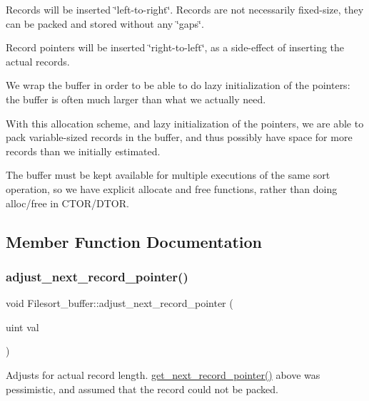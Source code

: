 Records will be inserted \char`\"{}left-\/to-\/right\char`\"{}. Records are not necessarily fixed-\/size, they can be packed and stored without any \char`\"{}gaps\char`\"{}.

Record pointers will be inserted \char`\"{}right-\/to-\/left\char`\"{}, as a side-\/effect of inserting the actual records.

We wrap the buffer in order to be able to do lazy initialization of the pointers\+: the buffer is often much larger than what we actually need.

With this allocation scheme, and lazy initialization of the pointers, we are able to pack variable-\/sized records in the buffer, and thus possibly have space for more records than we initially estimated.

The buffer must be kept available for multiple executions of the same sort operation, so we have explicit allocate and free functions, rather than doing alloc/free in C\+T\+O\+R/\+D\+T\+OR. 

\subsection{Member Function Documentation}
\mbox{\label{classFilesort__buffer_a69e06f3b69cc78e6450de38e2508e208}} 
\subsubsection{\texorpdfstring{adjust\+\_\+next\+\_\+record\+\_\+pointer()}{adjust\_next\_record\_pointer()}}
{\footnotesize\ttfamily void Filesort\+\_\+buffer\+::adjust\+\_\+next\+\_\+record\+\_\+pointer (\begin{DoxyParamCaption}\item[{uint}]{val }\end{DoxyParamCaption})\hspace{0.3cm}{\ttfamily [inline]}}

Adjusts for actual record length. \mbox{\hyperlink{classFilesort__buffer_a4ab5d2686a9d85b333e9250015b32a1c}{get\+\_\+next\+\_\+record\+\_\+pointer()}} above was pessimistic, and assumed that the record could not be packed. \mbox{\label{classFilesort__buffer_a200aa06db9842f368384b0943d01c806}} 
